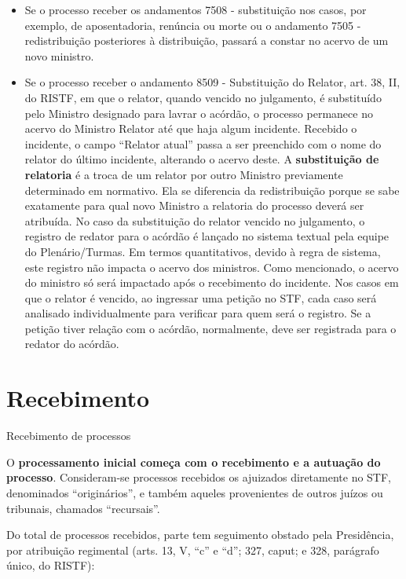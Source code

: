 \documentclass[
]{book}
\providecommand{\tightlist}{%
  \setlength{\itemsep}{0pt}\setlength{\parskip}{0pt}}
\begin{document}
\begin{itemize}
\tightlist
\item
  Se o processo receber os andamentos 7508 - substituição nos casos, por exemplo, de aposentadoria, renúncia ou morte ou o andamento 7505 - redistribuição posteriores à distribuição, passará a constar no acervo de um novo ministro.
\item
  Se o processo receber o andamento 8509 - Substituição do Relator, art. 38, II, do RISTF, em que o relator, quando vencido no julgamento, é substituído pelo Ministro designado para lavrar o acórdão, o processo permanece no acervo do Ministro Relator até que haja algum incidente. Recebido o incidente, o campo ``Relator atual'' passa a ser preenchido com o nome do relator do último incidente, alterando o acervo deste.
  A \textbf{substituição de relatoria} é a troca de um relator por outro Ministro previamente determinado em normativo. Ela se diferencia da redistribuição porque se sabe exatamente para qual novo Ministro a relatoria do processo deverá ser atribuída.
  No caso da substituição do relator vencido no julgamento, o registro de redator para o acórdão é lançado no sistema textual pela equipe do Plenário/Turmas. Em termos quantitativos, devido à regra de sistema, este registro não impacta o acervo dos ministros. Como mencionado, o acervo do ministro só será impactado após o recebimento do incidente. Nos casos em que o relator é vencido, ao ingressar uma petição no STF, cada caso será analisado individualmente para verificar para quem será o registro. Se a petição tiver relação com o acórdão, normalmente, deve ser registrada para o redator do acórdão.
\end{itemize}

\hypertarget{recebimento}{%
\chapter{Recebimento}\label{recebimento}}

Recebimento de processos

O \textbf{processamento inicial começa com o recebimento e a autuação do processo}. Consideram-se processos recebidos os ajuizados diretamente no STF, denominados ``originários'', e também aqueles provenientes de outros juízos ou tribunais, chamados ``recursais''.

Do total de processos recebidos, parte tem seguimento obstado pela Presidência, por atribuição regimental (arts. 13, V, ``c'' e ``d''; 327, caput; e 328, parágrafo único, do RISTF):
\end{document}
